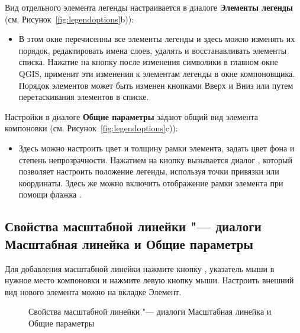 
Вид отдельного элемента легенды настраивается в диалоге
\textbf{Элементы легенды} (см. Рисунок~\ref{fig:legendoptions}b)):

\begin{itemize}[label=--]
\item В этом окне перечисенны все элементы легенды и здесь можно
изменять их порядок, редактировать имена слоев, удалять и восстанавливать
элементы списка. Нажатие на кнопку  после изменения
символики в главном окне QGIS, применит эти изменения к элементам
легенды в окне компоновщика. Порядок элементов может быть изменен
кнопками Вверх и Вниз или путем перетаскивания элементов в списке.
\end{itemize}


Настройки в диалоге \textbf{Общие параметры} задают общий вид
элемента компоновки (см. Рисунок~\ref{fig:legendoptions}c)):

\begin{itemize}[label=--]
\item Здесь можно настроить цвет и толщину рамки элемента, задать
цвет фона и степень непрозрачности. Нажатием на кнопку
 вызывается диалог ,
который позволяет настроить положение легенды, используя точки привязки
или координаты. Здесь же можно включить отображение рамки элемента при
помощи флажка .
\end{itemize}

\subsection{Свойства масштабной линейки "--- диалоги Масштабная линейка и Общие параметры}

Для добавления масштабной линейки нажмите кнопку
, указатель
мыши в нужное место компоновки и нажмите левую кнопку мыши. Настроить
внешний вид нового элемента можно на вкладке Элемент.

\begin{figure}[ht]
\centering
{}
\hspace{1cm}
\caption{Свойства масштабной линейки "--- диалоги Масштабная линейка и Общие параметры \nixcaption}\label{fig:scalebaroptions}
\end{figure}

